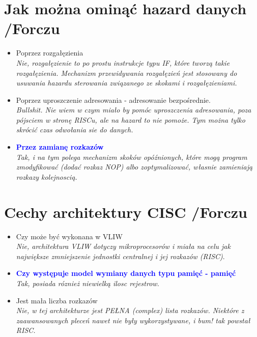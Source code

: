 \section{Jak można ominąć hazard danych {\small /Forczu}}
	\begin{itemize}
    \item Poprzez rozgałęzienia\\
    {\small \emph{Nie, rozgałęzienie to po prostu instrukcje typu IF, które tworzą takie rozgałęzienia. Mechanizm przewidywania rozgałęzień jest stosowany do usuwania hazardu sterowania związanego ze skokami i rozgałęzieniami.}}
    \item Poprzez uproszczenie adresowania - adresowanie bezpośrednie.\\
    {\small \emph{Bullshit. Nie wiem w czym miało by pomóc uproszczenia adresowania, poza pójsciem w stronę RISCu, ale na hazard to nie pomoże. Tym można tylko skrócić czas odwołania sie do danych.}}
    \item \textcolor{Blue}{\textbf{Przez zamianę rozkazów}}\\
    {\small \emph{Tak, i na tym polega mechanizm skoków opóźnionych, które mogą program zmodyfikować (dodać rozkaz NOP) albo zoptymalizować, własnie zamieniają rozkazy kolejnoscią.}}
    \end{itemize}

\section{Cechy architektury CISC {\small /Forczu}}
	\begin{itemize}
    \item Czy może być wykonana w VLIW\\
    {\small \emph{Nie, architektura VLIW dotyczy mikroprocesorów i miała na celu jak największe zmniejszenie jednostki centralnej i jej rozkazów (RISC)}. }
    \item \textcolor{Blue}{\textbf{Czy występuje model wymiany danych typu pamięć - pamięć}}\\
    {\small \emph{Tak, posiada róznież niewielką ilosc rejestrow.}}
    \item Jest mała liczba rozkazów\\
    {\small \emph{Nie, w tej architekturze jest PEŁNA (complex) lista rozkazów. Niektóre z zaawansowanych pleceń nawet nie były wykorzystywane, i bum! tak powstał RISC.}}
    \end{itemize}

